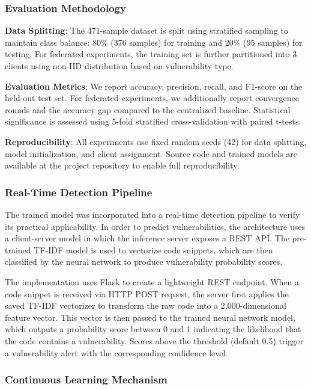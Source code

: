\documentclass[pdflatex,sn-mathphys-num]{sn-jnl}
\theoremstyle{thmstyleone}%
\theoremstyle{thmstyletwo}%
\theoremstyle{thmstylethree}%
\begin{document}
\subsubsection{Evaluation Methodology}

\textbf{Data Splitting}: The 471-sample dataset is split using stratified sampling to maintain class balance: 80\% (376 samples) for training and 20\% (95 samples) for testing. For federated experiments, the training set is further partitioned into 3 clients using non-IID distribution based on vulnerability type.

\textbf{Evaluation Metrics}: We report accuracy, precision, recall, and F1-score on the held-out test set. For federated experiments, we additionally report convergence rounds and the accuracy gap compared to the centralized baseline. Statistical significance is assessed using 5-fold stratified cross-validation with paired t-tests.

\textbf{Reproducibility}: All experiments use fixed random seeds (42) for data splitting, model initialization, and client assignment. Source code and trained models are available at the project repository to enable full reproducibility.

\subsubsection{Real-Time Detection Pipeline}\label{subsubsec:pipeline}

The trained model was incorporated into a real-time detection pipeline to verify its practical applicability. In order to predict vulnerabilities, the architecture uses a client-server model in which the inference server exposes a REST API. The pre-trained TF-IDF model is used to vectorize code snippets, which are then classified by the neural network to produce vulnerability probability scores.

The implementation uses Flask to create a lightweight REST endpoint. When a code snippet is received via HTTP POST request, the server first applies the saved TF-IDF vectorizer to transform the raw code into a 2,000-dimensional feature vector. This vector is then passed to the trained neural network model, which outputs a probability score between 0 and 1 indicating the likelihood that the code contains a vulnerability. Scores above the threshold (default 0.5) trigger a vulnerability alert with the corresponding confidence level.

\subsubsection{Continuous Learning Mechanism}\label{subsubsec:continuous}
\end{document}
